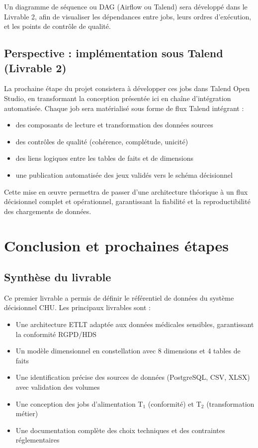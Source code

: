 \documentclass[12pt,a4paper]{article}
\begin{document}
Un diagramme de séquence ou DAG (Airflow ou Talend) sera développé dans le Livrable 2, afin de visualiser les dépendances entre jobs, leurs ordres d'exécution, et les points de contrôle de qualité.

\subsection{Perspective : implémentation sous Talend (Livrable 2)}

La prochaine étape du projet consistera à développer ces jobs dans Talend Open Studio, en transformant la conception présentée ici en chaîne d'intégration automatisée. Chaque job sera matérialisé sous forme de flux Talend intégrant :

\begin{itemize}[leftmargin=*]
    \item des composants de lecture et transformation des données sources
    \item des contrôles de qualité (cohérence, complétude, unicité)
    \item des liens logiques entre les tables de faits et de dimensions
    \item une publication automatisée des jeux validés vers le schéma décisionnel
\end{itemize}

Cette mise en œuvre permettra de passer d'une architecture théorique à un flux décisionnel complet et opérationnel, garantissant la fiabilité et la reproductibilité des chargements de données.

\newpage
\section{Conclusion et prochaines étapes}

\subsection{Synthèse du livrable}

Ce premier livrable a permis de définir le référentiel de données du système décisionnel CHU. Les principaux livrables sont :

\begin{itemize}[leftmargin=*]
    \item Une architecture ETLT adaptée aux données médicales sensibles, garantissant la conformité RGPD/HDS
    \item Un modèle dimensionnel en constellation avec 8 dimensions et 4 tables de faits
    \item Une identification précise des sources de données (PostgreSQL, CSV, XLSX) avec validation des volumes
    \item Une conception des jobs d'alimentation T$_{1}$ (conformité) et T$_{2}$ (transformation métier)
    \item Une documentation complète des choix techniques et des contraintes réglementaires
\end{itemize}
\end{document}
